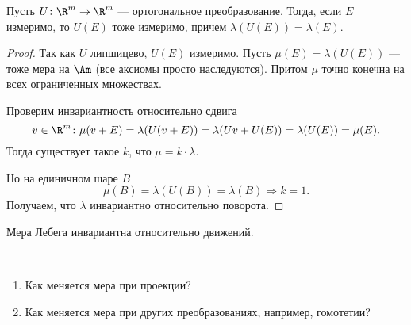\begin{thm}
	Пусть $ U\colon \R^{m} \to \R^{m} $ --- ортогональное преобразование. 
	Тогда, если $ E$ измеримо, то $ U(E)$ тоже измеримо, причем $ \lambda (U(E)) = \lambda (E)$.
\end{thm}
\begin{proof}
	Так как $ U$ липшицево, $ U(E)$ измеримо. Пусть $ \mu(E) = \lambda (U(E))$ --- тоже мера на $ \Am$ (все аксиомы просто наследуются). Притом $ \mu$ точно конечна на всех ограниченных множествах.

	Проверим инвариантность относительно сдвига
	\[
		v \in \R^{m} \colon \mu(v + E) = \lambda (U(v + E)) = \lambda (Uv + U(E)) = \lambda (U(E)) = \mu(E)
	.\] 
	Тогда существует такое $ k$, что $ \mu = k\cdot \lambda $.

	Но на единичном шаре $ B$ 
	\[
		\mu(B) = \lambda (U(B)) = \lambda (B) \Longrightarrow k = 1
	.\] 
	Получаем, что $ \lambda $ инвариантно относительно поворота.
\end{proof}
\begin{cor}
    Мера Лебега инвариантна относительно движений.
\end{cor}
\begin{prac}
	~\begin{enumerate}[noitemsep]
        \item Как меняется мера при проекции?
		\item Как меняется мера при других преобразованиях, например, гомотетии?
    \end{enumerate} 
\end{prac}


		\fontAwesomeSymbol{\faCar}

